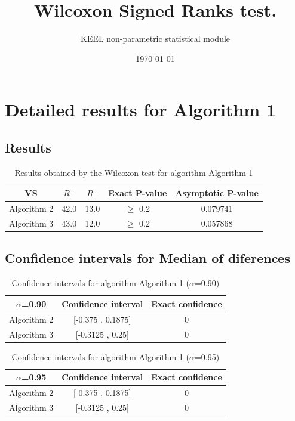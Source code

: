 \documentclass[a4paper,10pt]{article}
\title{Wilcoxon Signed Ranks test.}
\date{\today}
\author{KEEL non-parametric statistical module}
\begin{document}
\pagestyle{empty}
\maketitle
\thispagestyle{empty}



\section{Detailed results for Algorithm 1}


\subsection{Results}

\begin{table}[!htp]
\centering\small
\begin{tabular}{
|c|c|c|c|c|}
\hline
 VS & $R^{+}$ & $R^{-}$ & Exact P-value & Asymptotic P-value \\ \hline 
Algorithm 2 & 42.0 & 13.0 & $\geq$ 0.2 & 0.079741\\ \hline 
Algorithm 3 & 43.0 & 12.0 & $\geq$ 0.2 & 0.057868\\ \hline 

\end{tabular}
\caption{Results obtained by the Wilcoxon test for algorithm Algorithm 1}
\end{table}

\subsection{Confidence intervals for Median of diferences}

\begin{table}[!htp]
\centering\small
\begin{tabular}{
|c|c|c|}
\hline
 $\alpha$=0.90 & Confidence interval & Exact confidence \\ \hline 
Algorithm 2 & [-0.375 , 0.1875] & 0\\ \hline 
Algorithm 3 & [-0.3125 , 0.25] & 0\\ \hline 

\end{tabular}
\caption{Confidence intervals for algorithm Algorithm 1 ($\alpha$=0.90)}
\end{table}
\begin{table}[!htp]
\centering\small
\begin{tabular}{
|c|c|c|}
\hline
 $\alpha$=0.95 & Confidence interval & Exact confidence \\ \hline 
Algorithm 2 & [-0.375 , 0.1875] & 0\\ \hline 
Algorithm 3 & [-0.3125 , 0.25] & 0\\ \hline 

\end{tabular}
\caption{Confidence intervals for algorithm Algorithm 1 ($\alpha$=0.95)}
\end{table}
\end{document}
